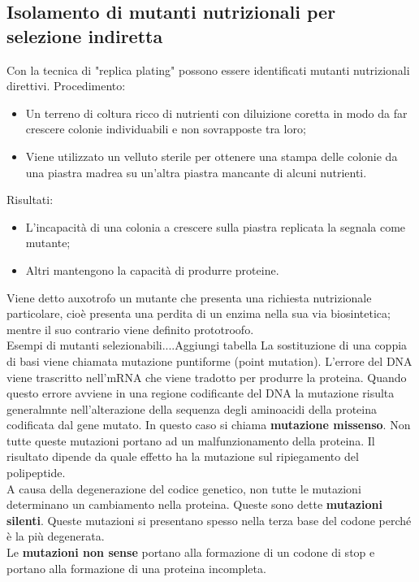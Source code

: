 \subsection{Isolamento di mutanti nutrizionali per selezione indiretta}
Con la tecnica di "replica plating" possono essere identificati mutanti nutrizionali direttivi. Procedimento: 
\begin{itemize}
    \item Un terreno di coltura ricco di nutrienti con diluizione coretta in modo da far crescere colonie individuabili e non sovrapposte tra loro; 
    \item Viene utilizzato un velluto sterile per ottenere una stampa delle colonie da una piastra madrea su un'altra piastra mancante di alcuni nutrienti.
\end{itemize}
Risultati:
\begin{itemize}
    \item L'incapacità di una colonia a crescere sulla piastra replicata la segnala come mutante; 
    \item Altri mantengono la capacità di produrre proteine.
\end{itemize}
Viene detto auxotrofo  un mutante che presenta una richiesta nutrizionale particolare, cioè presenta una perdita di un enzima nella sua via biosintetica; mentre il suo contrario viene definito prototroofo. 
\\Esempi di mutanti selezionabili....Aggiungi tabella
La sostituzione di una coppia di basi viene chiamata mutazione puntiforme (point mutation). L'errore del DNA viene trascritto nell'mRNA che viene tradotto per produrre la proteina. Quando questo errore avviene in una regione codificante del DNA la mutazione risulta generalmnte nell'alterazione della sequenza degli aminoacidi della proteina codificata dal gene mutato. In questo caso si chiama \textbf{mutazione missenso}. Non tutte queste mutazioni portano ad un malfunzionamento della proteina. Il risultato dipende da quale effetto ha la mutazione sul ripiegamento del polipeptide. 
\\A causa della degenerazione del codice genetico, non tutte le mutazioni determinano un cambiamento nella proteina. Queste sono dette \textbf{mutazioni silenti}. Queste mutazioni si presentano spesso nella terza base del codone perché è la più degenerata.
\\Le \textbf{mutazioni non sense} portano alla formazione di un codone di stop e portano alla formazione di una proteina incompleta. 
